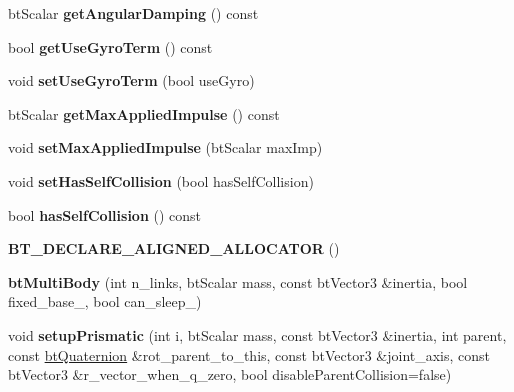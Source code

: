 \begin{DoxyCompactItemize}
bt\+Scalar {\bfseries get\+Angular\+Damping} () const
\item 
\mbox{\label{classbtMultiBody_a21cb8e09cc1a6b060fc39b6335fc0a2c}} 
bool {\bfseries get\+Use\+Gyro\+Term} () const
\item 
\mbox{\label{classbtMultiBody_a2bcc1281a4e5d88d68c1caf6baa691c7}} 
void {\bfseries set\+Use\+Gyro\+Term} (bool use\+Gyro)
\item 
\mbox{\label{classbtMultiBody_aa3573138f236844e4e141039740da588}} 
bt\+Scalar {\bfseries get\+Max\+Applied\+Impulse} () const
\item 
\mbox{\label{classbtMultiBody_a0d79a9b5c5371b661b7692ee3d4a9e75}} 
void {\bfseries set\+Max\+Applied\+Impulse} (bt\+Scalar max\+Imp)
\item 
\mbox{\label{classbtMultiBody_a4c7bc3057da41bae8fa8873ea9dbb191}} 
void {\bfseries set\+Has\+Self\+Collision} (bool has\+Self\+Collision)
\item 
\mbox{\label{classbtMultiBody_a53daf4eedb691d0b4dc280147a932aa3}} 
bool {\bfseries has\+Self\+Collision} () const
\item 
\mbox{\label{classbtMultiBody_a607c1ece0fdf16a6d32ac8eafd91976e}} 
{\bfseries B\+T\+\_\+\+D\+E\+C\+L\+A\+R\+E\+\_\+\+A\+L\+I\+G\+N\+E\+D\+\_\+\+A\+L\+L\+O\+C\+A\+T\+OR} ()
\item 
\mbox{\label{classbtMultiBody_ab221797839166ac108b3878c3a823768}} 
{\bfseries bt\+Multi\+Body} (int n\+\_\+links, bt\+Scalar mass, const bt\+Vector3 \&inertia, bool fixed\+\_\+base\+\_\+, bool can\+\_\+sleep\+\_\+)
\item 
\mbox{\label{classbtMultiBody_ad9921754c20a1de7fbc4dfe82e3ccba2}} 
void {\bfseries setup\+Prismatic} (int i, bt\+Scalar mass, const bt\+Vector3 \&inertia, int parent, const \hyperlink{classbtQuaternion}{bt\+Quaternion} \&rot\+\_\+parent\+\_\+to\+\_\+this, const bt\+Vector3 \&joint\+\_\+axis, const bt\+Vector3 \&r\+\_\+vector\+\_\+when\+\_\+q\+\_\+zero, bool disable\+Parent\+Collision=false)
\item 

\end{DoxyCompactItemize}
